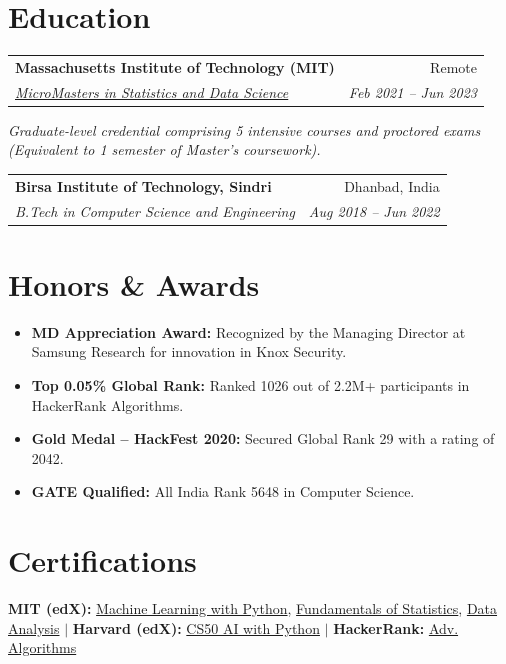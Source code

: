\documentclass[10pt, letterpaper]{article}
\makeatletter
\newcommand{\resumeItem}[1]{
  \item\small{
    {#1 \vspace{-2pt}}
  }
}
\newcommand{\resumeSubheading}[4]{
  \vspace{-1pt}\item
    \begin{tabular*}{0.98\textwidth}[t]{l@{\extracolsep{\fill}}r}
      \textbf{#1} & {\small\color{darkgray} #2} \\
      \textit{\small#3} & \textit{\small\color{darkgray} #4} \\
    \end{tabular*}\vspace{-7pt}
}
\newcommand{\resumeSubHeadingListStart}{\begin{itemize}[leftmargin=0.15in, label={}]}
\newcommand{\resumeSubHeadingListEnd}{\end{itemize}}
\makeatother
\begin{document}
\section{Education}
  \resumeSubHeadingListStart
    \resumeSubheading
      {Massachusetts Institute of Technology (MIT)}{Remote}
      {\href{https://micromasters.mit.edu/ds}{MicroMasters in Statistics and Data Science}}{Feb 2021 -- Jun 2023}
      \vspace{-4pt}
      \small{\item{\textit{Graduate-level credential comprising 5 intensive courses and proctored exams (Equivalent to 1 semester of Master's coursework).}}}
    \resumeSubheading
      {Birsa Institute of Technology, Sindri}{Dhanbad, India}
      {B.Tech in Computer Science and Engineering}{Aug 2018 -- Jun 2022}
  \resumeSubHeadingListEnd

\section{Honors \& Awards}
  \resumeSubHeadingListStart
    \resumeItem{\textbf{MD Appreciation Award:} Recognized by the Managing Director at Samsung Research for innovation in Knox Security.}
    \resumeItem{\textbf{Top 0.05\% Global Rank:} Ranked 1026 out of 2.2M+ participants in HackerRank Algorithms.}
    \resumeItem{\textbf{Gold Medal -- HackFest 2020:} Secured Global Rank 29 with a rating of 2042.}
    \resumeItem{\textbf{GATE Qualified:} All India Rank 5648 in Computer Science.}
  \resumeSubHeadingListEnd

\section{Certifications}
  \small{
    \textbf{MIT (edX):} \href{https://courses.edx.org/certificates/bf4ea7cb34a742cea00c770801d1947d}{Machine Learning with Python}, \href{https://courses.edx.org/certificates/3c59035943454549990f2d2de7f49e9f}{Fundamentals of Statistics}, \href{https://courses.edx.org/certificates/bf4ea7cb34a742cea00c770801d1947d}{Data Analysis} $|$
    \textbf{Harvard (edX):} \href{https://cs50.harvard.edu/certificates/2b1773c1-473d-4a7b-89ae-460d23154126}{CS50 AI with Python} $|$
    \textbf{HackerRank:} \href{https://www.hackerrank.com/certificates/fc7b9af8aac8}{Adv. Algorithms}
  }
\end{document}
